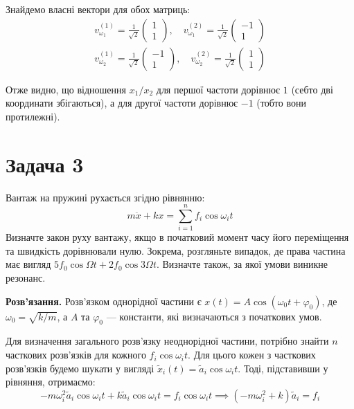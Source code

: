 \documentclass{hw_template}
\begin{document}
Знайдемо власні вектори для обох матриць:
\begin{gather*}
    v_{\omega_1}^{(1)} = \frac{1}{\sqrt{2}}\begin{pmatrix}
        1 \\ 1
    \end{pmatrix}, \quad v_{\omega_1}^{(2)} = \frac{1}{\sqrt{2}}\begin{pmatrix}
        -1 \\ 1
    \end{pmatrix} \\
    v_{\omega_2}^{(1)} = \frac{1}{\sqrt{2}}\begin{pmatrix}
        -1 \\ 1
    \end{pmatrix}, \quad v_{\omega_2}^{(2)} = \frac{1}{\sqrt{2}}\begin{pmatrix}
        1 \\ 1
    \end{pmatrix}
\end{gather*}

Отже видно, що відношення $x_1/x_2$ для першої частоти дорівнює $1$ (себто дві
координати збігаються), а для другої частоти дорівнює $-1$ (тобто вони
протилежні).

\section{Задача 3}

\begin{problem}
    Вантаж на пружині рухається згідно рівнянню:
    \begin{equation*}
        m\ddot{x} + kx = \sum_{i=1}^n f_i \cos \omega_i t
    \end{equation*}
    Визначте закон руху вантажу, якщо в початковий момент часу його переміщення
та швидкість дорівнювали нулю. Зокрема, розгляньте випадок, де права частина має
вигляд $5f_0 \cos \Omega t + 2f_0 \cos 3\Omega t$. Визначте також, за якої умови
виникне резонанс.
\end{problem}

\textbf{Розв'язання.} Розв'язком однорідної частини є $x(t) = A \cos (\omega_0 t + \varphi_0)$, 
де $\omega_0 = \sqrt{k/m}$, а $A$ та $\varphi_0$ --- константи, які
визначаються з початкових умов. 

Для визначення загального розв'язку неоднорідної частини, потрібно знайти $n$
часткових розв'язків для кожного $f_i \cos \omega_i t$. Для цього кожен з
часткових розв'язків будемо шукати у вигляді $\widetilde{x}_i(t) =
\widetilde{a}_i \cos \omega_i t$. Тоді, підставивши у рівняння, отримаємо:
\begin{equation*}
    -m\omega_i^2 \widetilde{a}_i \cos \omega_i t + k\widetilde{a}_i \cos \omega_i t = f_i \cos \omega_i t \implies (-m\omega_i^2 + k)\widetilde{a}_i = f_i
\end{equation*}
\end{document}

